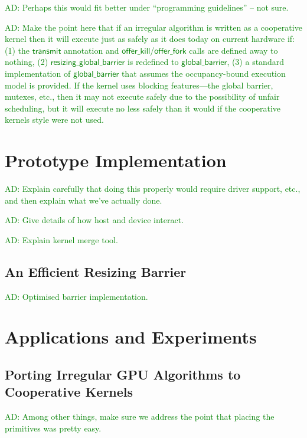 \documentclass[nocopyrightspace]{sigplanconf-pldi16}
\newcommand{\ADComment}[1]{\textcolor{green}{AD: #1}}
\newcommand{\transmit}{\mathsf{transmit}}
\newcommand{\offerfork}{\mathsf{offer\_fork}}
\newcommand{\offerkill}{\mathsf{offer\_kill}}
\newcommand{\globalbarrier}{\mathsf{global\_barrier}}
\newcommand{\resizingglobalbarrier}{\mathsf{resizing\_global\_barrier}}
\begin{document}
\ADComment{Perhaps this would fit better under ``programming guidelines'' -- not sure.}

\ADComment{Make the point here that if an irregular algorithm is
  written as a cooperative kernel then it will execute just as safely
  as it does today on current hardware if: (1) the $\transmit$
  annotation and $\offerkill$/$\offerfork$ calls are defined away to
  nothing, (2) $\resizingglobalbarrier$ is redefined to
  $\globalbarrier$, (3) a standard implementation of $\globalbarrier$
  that assumes the occupancy-bound execution model is provided.  If the kernel uses blocking features---the global barrier, mutexes, etc., then it may not execute safely due to the possibility of unfair scheduling, but it will execute no less safely than it would if the cooperative kernels style were not used.}


\section{Prototype Implementation}\label{sec:implementation}

\ADComment{Explain carefully that doing this properly would require
  driver support, etc., and then explain what we've actually done.}

\ADComment{Give details of how host and device interact.}

\ADComment{Explain kernel merge tool.}

\subsection{An Efficient Resizing Barrier}\label{sec:resizingbarrier}

\ADComment{Optimised barrier implementation.}



\section{Applications and Experiments}\label{sec:experiments}

\subsection{Porting Irregular GPU Algorithms to Cooperative Kernels}\label{sec:portingalgorithms}

\ADComment{Among other things, make sure we address the point that placing the primitives was pretty easy.}
\end{document}
